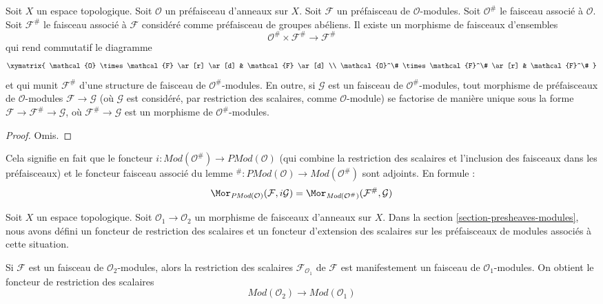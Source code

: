 \begin{lemma}
\label{lemma-sheafification-presheaf-modules}
Soit $X$ un espace topologique.
Soit $\mathcal{O}$ un préfaisceau d'anneaux sur $X$.
Soit $\mathcal{F}$ un préfaisceau de $\mathcal{O}$-modules.
Soit $\mathcal{O}^\#$ le faisceau associé à $\mathcal{O}$.
Soit $\mathcal{F}^\#$ le faisceau associé à $\mathcal{F}$
considéré comme préfaisceau de groupes abéliens. Il existe un morphisme de
faisceaux d'ensembles
$$
\mathcal{O}^\# \times \mathcal{F}^\#
\longrightarrow
\mathcal{F}^\#
$$
qui rend commutatif le diagramme
$$
\xymatrix{
\mathcal{O} \times \mathcal{F} \ar[r] \ar[d] &
\mathcal{F} \ar[d] \\
\mathcal{O}^\# \times \mathcal{F}^\# \ar[r] &
\mathcal{F}^\#
}
$$
et qui munit $\mathcal{F}^\#$ d'une structure de faisceau
de $\mathcal{O}^\#$-modules. En outre, si $\mathcal{G}$
est un faisceau de $\mathcal{O}^\#$-modules, tout morphisme
de préfaisceaux de $\mathcal{O}$-modules $\mathcal{F} \to \mathcal{G}$
(où $\mathcal{G}$ est considéré, par restriction des scalaires, comme $\mathcal{O}$-module)
se factorise de manière unique sous la forme $\mathcal{F} \to \mathcal{F}^\# \to \mathcal{G}$,
où $\mathcal{F}^\# \to \mathcal{G}$ est un morphisme de
$\mathcal{O}^\#$-modules.
\end{lemma}

\begin{proof}
Omis.
\end{proof}

\noindent
Cela signifie en fait que le foncteur
$i : \textit{Mod}(\mathcal{O}^\#) \to \textit{PMod}(\mathcal{O})$
(qui combine la restriction des scalaires et l'inclusion des faisceaux dans les préfaisceaux)
et le foncteur faisceau associé du lemme
${}^\# : \textit{PMod}(\mathcal{O}) \to \textit{Mod}(\mathcal{O}^\#)$
sont adjoints. En formule :
$$
\Mor_{\textit{PMod}(\mathcal{O})}(\mathcal{F}, i\mathcal{G})
=
\Mor_{\textit{Mod}(\mathcal{O}^\#)}(\mathcal{F}^\#, \mathcal{G})
$$

\medskip\noindent
Soit $X$ un espace topologique.
Soit $\mathcal{O}_1 \to \mathcal{O}_2$ un
morphisme de faisceaux d'anneaux sur $X$.
Dans la section \ref{section-presheaves-modules},
nous avons défini un foncteur de restriction des scalaires
et un foncteur d'extension des scalaires sur les préfaisceaux de modules
associés à cette situation.

\medskip\noindent
Si $\mathcal{F}$ est un faisceau de $\mathcal{O}_2$-modules,
alors la restriction des scalaires $\mathcal{F}_{\mathcal{O}_1}$
de $\mathcal{F}$ est manifestement un faisceau
de $\mathcal{O}_1$-modules. On obtient le foncteur de restriction des scalaires
$$
\textit{Mod}(\mathcal{O}_2)
\longrightarrow
\textit{Mod}(\mathcal{O}_1)
$$


